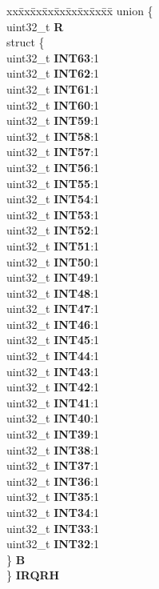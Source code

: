 \begin{DoxyCompactItemize}
\begin{tabbing}
\end{tabbing}\item 
\mbox{\label{structEDMA__tag_a1152ab2b33263577790324188b395669}} 
\begin{tabbing}
xx\=xx\=xx\=xx\=xx\=xx\=xx\=xx\=xx\=\kill
union \{\\
\>uint32\_t {\bfseries R}\\
\>struct \{\\
\>\>uint32\_t {\bfseries INT63}:1\\
\>\>uint32\_t {\bfseries INT62}:1\\
\>\>uint32\_t {\bfseries INT61}:1\\
\>\>uint32\_t {\bfseries INT60}:1\\
\>\>uint32\_t {\bfseries INT59}:1\\
\>\>uint32\_t {\bfseries INT58}:1\\
\>\>uint32\_t {\bfseries INT57}:1\\
\>\>uint32\_t {\bfseries INT56}:1\\
\>\>uint32\_t {\bfseries INT55}:1\\
\>\>uint32\_t {\bfseries INT54}:1\\
\>\>uint32\_t {\bfseries INT53}:1\\
\>\>uint32\_t {\bfseries INT52}:1\\
\>\>uint32\_t {\bfseries INT51}:1\\
\>\>uint32\_t {\bfseries INT50}:1\\
\>\>uint32\_t {\bfseries INT49}:1\\
\>\>uint32\_t {\bfseries INT48}:1\\
\>\>uint32\_t {\bfseries INT47}:1\\
\>\>uint32\_t {\bfseries INT46}:1\\
\>\>uint32\_t {\bfseries INT45}:1\\
\>\>uint32\_t {\bfseries INT44}:1\\
\>\>uint32\_t {\bfseries INT43}:1\\
\>\>uint32\_t {\bfseries INT42}:1\\
\>\>uint32\_t {\bfseries INT41}:1\\
\>\>uint32\_t {\bfseries INT40}:1\\
\>\>uint32\_t {\bfseries INT39}:1\\
\>\>uint32\_t {\bfseries INT38}:1\\
\>\>uint32\_t {\bfseries INT37}:1\\
\>\>uint32\_t {\bfseries INT36}:1\\
\>\>uint32\_t {\bfseries INT35}:1\\
\>\>uint32\_t {\bfseries INT34}:1\\
\>\>uint32\_t {\bfseries INT33}:1\\
\>\>uint32\_t {\bfseries INT32}:1\\
\>\} {\bfseries B}\\
\} {\bfseries IRQRH}\\


\end{tabbing}
\end{DoxyCompactItemize}
